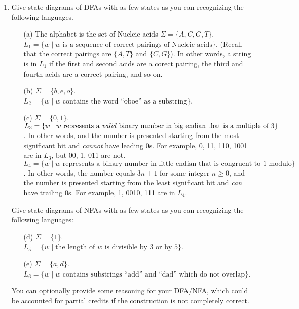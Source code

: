 \documentclass[letterpaper,11pt]{article}
\begin{document}
\begin{enumerate}
\item
	Give state diagrams of DFAs with as few states as you can recognizing the following languages.
	\begin{enumerate}
    \item[(a)] The alphabet is the set of Nucleic acids $\Sigma = \{A, C, G, T\}$. \\
    \(L_1 = \{w\mid w \text{ is a sequence of correct  pairings of Nucleic acids}\}\). (Recall that the correct pairings are  $\{A,T\}$ and $\{C,G\}$). In other words,  a string is in $L_1$ if the first and second acids  are a corect pairing, the third and fourth acids are a correct pairing,  and so on. %
		
    \item[(b)] $\Sigma = \{b, e, o\}$. \\
    $L_2 = \{w \mid w \text{ contains the word ``oboe'' as a substring}\}$.
    
		\item[(c)] $\Sigma = \{0, 1\}$. \\
    \(L_3 = \{w\mid w \text{ represents a \emph{valid} binary number in big endian that is a multiple of }3\}\). In other words, and the number is presented starting from the most significant bit and \emph{cannot} have leading 0s.
    For example, 0, 11, 110, 1001 are in $L_3$, but 00, 1, 011 are not.
    \\
    \(L_4 = \{w\mid w \text{ represents a binary number in little endian that is congruent to 1 modulo 3}\}\). In other words, the number equals $3n + 1$ for some integer $n \ge 0$, and the number is presented starting from the least significant bit and \emph{can} have trailing 0s. For example, 1, 0010, 111 are in $L_4$.
	\end{enumerate}
	Give state diagrams of NFAs with as few states as you can recognizing the following languages:
	\begin{enumerate}
		\item[(d)] $\Sigma = \{1\}$. \\
    \(L_5 =\{w \mid \text{the length of }w\text{ is divisible by 3 or by 5}\}\). %
		
		\item[(e)] $\Sigma = \{a, d\}$. \\
    \(L_6 = \{w \mid w \text{ contains substrings ``add'' and ``dad'' which do not overlap}\}\). %
	\end{enumerate}
  You can optionally provide some reasoning for your DFA/NFA, which could be accounted for partial credits if the construction is not completely correct.


\end{enumerate}
\end{document}
